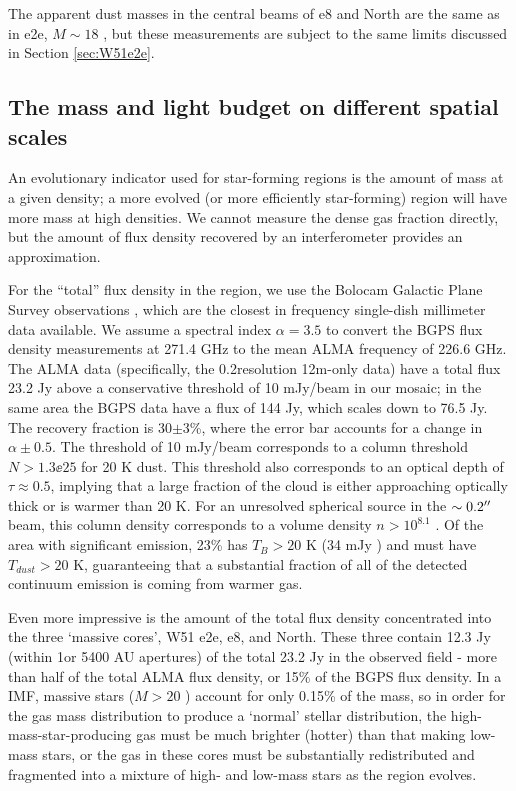 \documentclass{emulateapj}
\begin{document}
The apparent dust masses in the central beams of e8 and North are the same
as in e2e, $M\sim18$ \msun, but these measurements are subject to the same
limits discussed in Section \ref{sec:W51e2e}.

\subsection{The mass and light budget on different spatial scales}
\label{sec:massbudget}
An evolutionary indicator used for star-forming regions is the amount of mass
at a given density; a more evolved (or more efficiently star-forming) region will
have more mass at high densities.  We cannot measure the dense gas fraction
directly, but the amount of flux density recovered by an interferometer
provides an approximation.

For the ``total'' flux density in the region, we use the Bolocam Galactic Plane
Survey observations \citep{Aguirre2011a,Ginsburg2013a}, which are the closest
in frequency single-dish millimeter data available.  We assume a spectral index
$\alpha=3.5$ to convert the BGPS flux density measurements at 271.4 GHz to the
mean ALMA frequency of 226.6 GHz.  The ALMA data (specifically, the
0.2\arcsec resolution 12m-only data) have a total flux 23.2 Jy above a  conservative
threshold of 10 mJy/beam in our
mosaic; in the same area the BGPS data have a flux of 144 Jy, which scales down to
76.5 Jy.  The recovery fraction is 30$\pm3$\%, where the error bar accounts
for a change in $\alpha\pm0.5$.  The threshold of 10 mJy/beam corresponds to a
column threshold $N>1.3\ee{25}$ \percc for 20 K dust. This threshold also
corresponds to an optical depth of $\tau\approx0.5$, implying that a large
fraction of the cloud is either approaching optically thick or is warmer than 20
K.  For an unresolved spherical source in the $\sim0.2\mbox{$^{\prime\prime}$}$ beam, this
column density corresponds to a volume density $n>10^{8.1}$ \percc.
Of the area with significant emission, 23\% has $T_B>20$ K (34 mJy \perbeam)
and must have $T_{dust}>20$ K, guaranteeing that a substantial fraction of all
of the detected continuum emission is coming from warmer gas.


Even more impressive is the amount of the total flux density concentrated
into the three `massive cores', W51 e2e, e8, and North.  These three contain
12.3 Jy (within 1\arcsec or 5400 AU apertures) of the total 23.2 Jy in the
observed field - more than half of the total ALMA flux density, or 15\% of the
BGPS flux density.  In a \citet{Kroupa2001a} IMF, massive stars ($M>20$ \msun)
account for only 0.15\% of the mass, so in order for the gas mass distribution
to produce a `normal' stellar distribution, the high-mass-star-producing gas
must be much brighter (hotter) than that making low-mass stars, or the gas 
in these cores must be substantially redistributed and fragmented into a
mixture of high- and low-mass stars as the region evolves.
\end{document}
